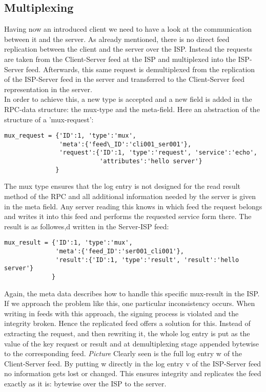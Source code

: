 \subsection{Multiplexing}
Having now an introduced client we need to have a look at the communication between it and the server. As already mentioned, there is no direct feed replication between the client and the server over the ISP. Instead the requests are taken from the Client-Server feed at the ISP and multiplexed into the ISP-Server feed. Afterwards, this same request is demultiplexed from the replication of the ISP-Server feed in the server and transferred to the Client-Server feed representation in the server.\\
In order to achieve this, a new type is accepted and a new field is added in the RPC-data structure: the mux-type and the meta-field. Here an abstraction of the structure of a ’mux-request’:\\
\begin{lstlisting}
mux_request = {'ID':1, 'type':'mux', 
               'meta':{'feed\_ID':'cli001_ser001'},
               'request':{'ID':1, 'type':'request', 'service':'echo', 
                          'attributes':'hello server'}
              }
\end{lstlisting}
The mux type ensures that the log entry is not designed for the read result method of the RPC and all additional information needed by the server is given in the meta field. Any server reading this knows in which feed the request belongs and writes it into this feed and performs the requested service form there. The result is as followes,d written in the Server-ISP
feed:\\
\begin{lstlisting}
mux_result = {'ID':1, 'type':'mux', 
              'meta':{'feed_ID':'ser001_cli001'},
              'result':{'ID':1, 'type':'result', 'result':'hello server'}
             }
\end{lstlisting}
Again, the meta data describes how to handle this specific mux-result in the ISP. If we approach the problem like this, one particular inconsistency occurs. When writing in feeds with this approach, the signing process is violated and the integrity broken. Hence the replicated feed offers a solution for this. Instead of extracting the request, and then rewriting it, the whole log entry is put as the value of the key request or result and at demultiplexing stage appended bytewise to the corresponding feed.
\textit{Picture}
Clearly seen is the full log entry w of the Client-Server feed. By putting w directly in the log entry v of the ISP-Server feed no information gets lost or changed. This ensures integrity and replicates the feed exactly as it is: bytewise over the ISP to the server.
